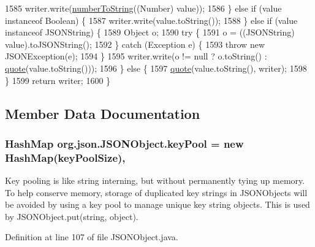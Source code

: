 \begin{DoxyCode}
1585             writer.write(\hyperlink{classorg_1_1json_1_1_j_s_o_n_object_a5ea1eb29e2e3bdc7b4fae0579ead8525}{numberToString}((Number) value));
1586         \} \textcolor{keywordflow}{else} \textcolor{keywordflow}{if} (value instanceof Boolean) \{
1587             writer.write(value.toString());
1588         \} \textcolor{keywordflow}{else} \textcolor{keywordflow}{if} (value instanceof JSONString) \{
1589             Object o;
1590             \textcolor{keywordflow}{try} \{
1591                 o = ((JSONString) value).toJSONString();
1592             \} \textcolor{keywordflow}{catch} (Exception e) \{
1593                 \textcolor{keywordflow}{throw} \textcolor{keyword}{new} JSONException(e);
1594             \}
1595             writer.write(o != null ? o.toString() : \hyperlink{classorg_1_1json_1_1_j_s_o_n_object_abe60222a3919d3f88f104486c1ef13fe}{quote}(value.toString()));
1596         \} \textcolor{keywordflow}{else} \{
1597             \hyperlink{classorg_1_1json_1_1_j_s_o_n_object_abe60222a3919d3f88f104486c1ef13fe}{quote}(value.toString(), writer);
1598         \}
1599         \textcolor{keywordflow}{return} writer;
1600     \}
\end{DoxyCode}


\subsection{Member Data Documentation}
\hypertarget{classorg_1_1json_1_1_j_s_o_n_object_a7bcba855d8493d0205256068ddd41314}{
\subsubsection[{key\-Pool}]{\setlength{\rightskip}{0pt plus 5cm}Hash\-Map org.\-json.\-J\-S\-O\-N\-Object.\-key\-Pool = new Hash\-Map({\bf key\-Pool\-Size})\hspace{0.3cm}{\ttfamily [static]}, {\ttfamily [private]}}}\label{classorg_1_1json_1_1_j_s_o_n_object_a7bcba855d8493d0205256068ddd41314}
Key pooling is like string interning, but without permanently tying up memory. To help conserve memory, storage of duplicated key strings in J\-S\-O\-N\-Objects will be avoided by using a key pool to manage unique key string objects. This is used by J\-S\-O\-N\-Object.\-put(string, object). 

Definition at line 107 of file J\-S\-O\-N\-Object.\-java.



